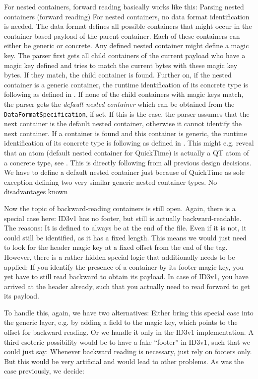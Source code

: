 For nested containers, forward reading basically works like this:
{%
Parsing nested containers (forward reading)
}
{%
For nested containers, no data format identification is needed. The data format defines all possible containers that might occur in the container-based payload of the parent container. Each of these containers can either be generic or concrete. Any defined nested container might define a magic key. The parser first gets all child containers of the current payload who have a magic key defined and  tries to match the current bytes with these magic key bytes. If they match, the child container is found. Further on, if the nested container is a generic container, the runtime identification of its concrete type is following as defined in . If none of the child containers with magic keys match, the parser gets the \emph{default nested container} which can be obtained from the \texttt{DataFormatSpecification}, if set. If this is the case, the parser assumes that the next container is the default nested container, otherwise it cannot identify the next container. If a container is found and this container is generic, the runtime identification of its concrete type is following as defined in . This might e.g. reveal that an atom (default nested container for QuickTime) is actually a QT atom of a concrete type, see .
}
{%
This is directly following from all previous design decisions. We have to define a default nested container just because of QuickTime as sole exception defining two very similar generic nested container types.
}
{%
No disadvantages known
}

Now the topic of backward-reading containers is still open. Again, there is a special case here: ID3v1 has no footer, but still is actually backward-readable. The reasons: It is defined to always be at the end of the file. Even if it is not, it could still be identified, as it has a fixed length. This means we would just need to look for the header magic key at a fixed offset from the end of the tag. However, there is a rather hidden special logic that additionally needs to be applied: If you identify the presence of a container by its footer magic key, you yet have to still read backward to obtain its payload. In case of ID3v1, you have arrived at the header already, such that you actually need to read forward to get its payload. 

To handle this, again, we have two alternatives: Either bring this special case into the generic layer, e.g. by adding a field to the magic key, which points to the offset for backward reading. Or we handle it only in the ID3v1 implementation. A third esoteric possibility would be to have a fake ``footer'' in ID3v1, such that we could just say: Whenever backward reading is necessary, just rely on footers only. But this would be very artificial and would lead to other problems. As was the case previously, we decide: 

